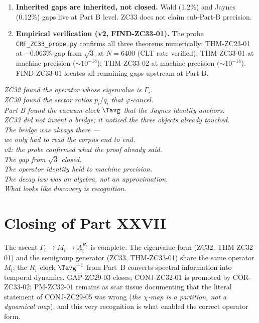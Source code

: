 \documentclass[12pt, a4paper]{article}
\begin{document}
\begin{enumerate}[leftmargin=*]
\item \textbf{Inherited gaps are inherited, not closed.}
Wald (1.2\%) and Jaynes (0.12\%) gaps live at Part B level.
ZC33 does not claim sub-Part-B precision.

\item \textbf{Empirical verification (v2, FIND-ZC33-01).}
The probe \texttt{CRF\_ZC33\_probe.py} confirms all three
theorems numerically: THM-ZC23-01 at $-0.063\%$ gap from
$\sqrt{3}$ at $N=6400$ (CLT rate verified); THM-ZC33-01 at
machine precision ($\sim 10^{-18}$); THM-ZC33-02 at machine
precision ($\sim 10^{-14}$). FIND-ZC33-01 locates all
remaining gaps upstream at Part B.

\end{enumerate}

\bigskip
\begin{center}
\textit{ZC32 found the operator whose eigenvalue is $\Gamma_i$.\\
ZC30 found the sector ratios $p_i/q_i$ that $\varphi$-cancel.\\
Part B found the vacuum clock $\Tavg$ that the Jaynes
identity anchors.\\
ZC33 did not invent a bridge; it noticed the three
objects already touched.\\
The bridge was always there ---\\
we only had to read the corpus end to end.\\[6pt]
v2: the probe confirmed what the proof already said.\\
The gap from $\sqrt{3}$ closed.\\
The operator identity held to machine precision.\\
The decay law was an algebra, not an approximation.\\
What looks like discovery is recognition.}
\end{center}


\section*{Closing of Part XXVII}

\begin{keybox}[title={Part XXVII Summary}]
The ascent
$\Gamma_i \to M_i \to A_i^{R_1}$
is complete. The eigenvalue form (ZC32, THM-ZC32-01) and the
semigroup generator (ZC33, THM-ZC33-01) share the same operator
$M_i$; the $R_1$-clock $\Tavg^{-1}$ from Part~B converts spectral
information into temporal dynamics. GAP-ZC29-03 closes; CONJ-ZC32-01
is promoted by COR-ZC33-02; PM-ZC32-01 remains as scar tissue
documenting that the literal statement of CONJ-ZC29-05 was wrong
(\emph{the $\chi$-map is a partition, not a dynamical map}), and
this very recognition is what enabled the correct operator form.
\end{keybox}
\end{document}
